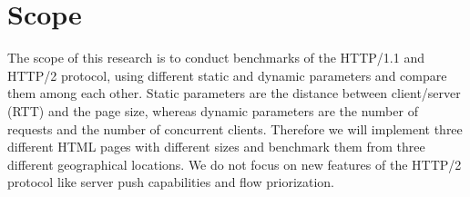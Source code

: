 \section{Scope}
\label{scope}
The scope of this research is to conduct benchmarks of the HTTP/1.1 and HTTP/2 protocol, using different static and dynamic parameters and compare them among each other. Static parameters are the distance between client/server (RTT) and the page size, whereas dynamic parameters are the number of requests and the number of concurrent clients. Therefore we will implement three different HTML pages with different sizes and benchmark them from three different geographical locations.  We do not focus on new features of the HTTP/2 protocol like server push capabilities and flow priorization.  

